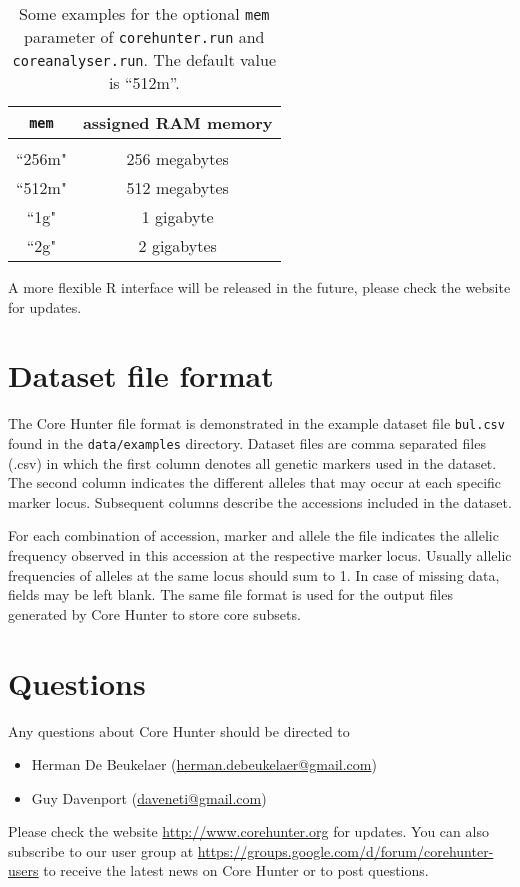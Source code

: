 \documentclass[a4paper, titlepage, 11pt]{article}
\begin{document}
\begin{table}
	\centering
	\begin{tabular}{c|c}
		\texttt{mem} & assigned RAM memory\\[1ex]
		\hline
		\\[-1ex]
		``256m" & 256 megabytes\\
		``512m" & 512 megabytes\\
		``1g" & 1 gigabyte\\
		``2g" & 2 gigabytes
	\end{tabular}
	\caption{Some examples for the optional \texttt{mem} parameter of \texttt{corehunter.run} and \texttt{coreanalyser.run}. The default value is ``512m''.}
	\label{tab:mem}
\end{table}

A more flexible R interface will be released in the future, please check the website for updates.

\section{Dataset file format}

The Core Hunter file format is demonstrated in the example dataset file \texttt{bul.csv} found in the \texttt{data/examples} directory. Dataset files are comma separated files (.csv) in which the first column denotes all genetic markers used in the dataset. The second column indicates the different alleles that may occur at each specific marker locus. Subsequent columns describe the accessions included in the dataset.

For each combination of accession, marker and allele the file indicates the allelic frequency observed in this accession at the respective marker locus. Usually allelic frequencies of alleles at the same locus should sum to 1. In case of missing data, fields may be left blank. The same file format is used for the output files generated by Core Hunter to store core subsets.

\section{Questions}

Any questions about Core Hunter should be directed to
\begin{itemize}

	\item Herman De Beukelaer (\href{mailto:herman.debeukelaer@gmail.com}{herman.debeukelaer@gmail.com})

	\item Guy Davenport (\href{mailto:daveneti@gmail.com}{daveneti@gmail.com})

\end{itemize}

Please check the website \url{http://www.corehunter.org} for updates. You can also subscribe to our user group at \url{https://groups.google.com/d/forum/corehunter-users} to receive the latest news on Core Hunter or to post questions.
\end{document}
